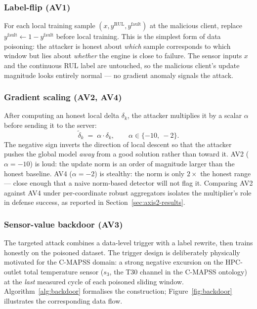 \documentclass[preprint,12pt,authoryear]{elsarticle}
\begin{document}
\subsubsection{Label-flip (AV1)}
\label{subsec:labelflip}

For each local training sample
$(x, y^{\mathrm{RUL}}, y^{\mathrm{fault}})$ at the malicious client,
replace $y^{\mathrm{fault}} \gets 1 - y^{\mathrm{fault}}$ before
local training. This is the simplest form of data poisoning: the
attacker is honest about \emph{which} sample corresponds to which
window but lies about \emph{whether} the engine is close to failure.
The sensor inputs $x$ and the continuous RUL label are untouched,
so the malicious client's update magnitude looks entirely normal ---
no gradient anomaly signals the attack.

\subsubsection{Gradient scaling (AV2, AV4)}
\label{subsec:gradscale}

After computing an honest local delta $\delta_k$, the attacker
multiplies it by a scalar $\alpha$ before sending it to the server:
\begin{equation}
    \tilde{\delta}_k \;=\; \alpha \cdot \delta_k,
    \qquad \alpha \in \{-10,\ -2\}.
    \label{eq:gradscale}
\end{equation}
The negative sign inverts the direction of local descent so that
the attacker pushes the global model \emph{away} from a good
solution rather than toward it. AV2 ($\alpha = -10$) is loud: the
update norm is an order of magnitude larger than the honest
baseline. AV4 ($\alpha = -2$) is stealthy: the norm is only
$2\times$ the honest range --- close enough that a naive norm-based
detector will not flag it. Comparing AV2 against AV4 under
per-coordinate robust aggregators isolates the multiplier's role in
defense success, as reported in Section~\ref{sec:axis2-results}.

\subsubsection{Sensor-value backdoor (AV3)}
\label{subsec:backdoor}

The targeted attack combines a data-level trigger with a label
rewrite, then trains honestly on the poisoned dataset. The trigger
design is deliberately physically motivated for the C-MAPSS domain:
a strong negative excursion on the HPC-outlet total temperature
sensor ($s_3$, the T30 channel in the C-MAPSS ontology) at the
\emph{last} measured cycle of each poisoned sliding window.
Algorithm~\ref{alg:backdoor} formalises the construction;
Figure~\ref{fig:backdoor} illustrates the corresponding data flow.
\end{document}
